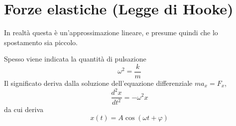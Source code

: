 \documentclass[a4paper]{article}
\begin{document}
\pagebreak

\section{Forze elastiche (Legge di Hooke)}


In realtà questa è un'approssimazione lineare,
e presume quindi che lo spostamento sia piccolo.

Spesso viene indicata la quantità di pulsazione
\[
    \omega^2 = \frac{k}{m}
\]
Il significato deriva dalla soluzione dell'equazione differenziale \(ma_x = F_x\),
\[
    \frac{d^2 x}{dt^2} = -\omega^2 x %
\]
da cui deriva
\[
    x(t) = A \cos(\omega t + \varphi)
\]
\end{document}
